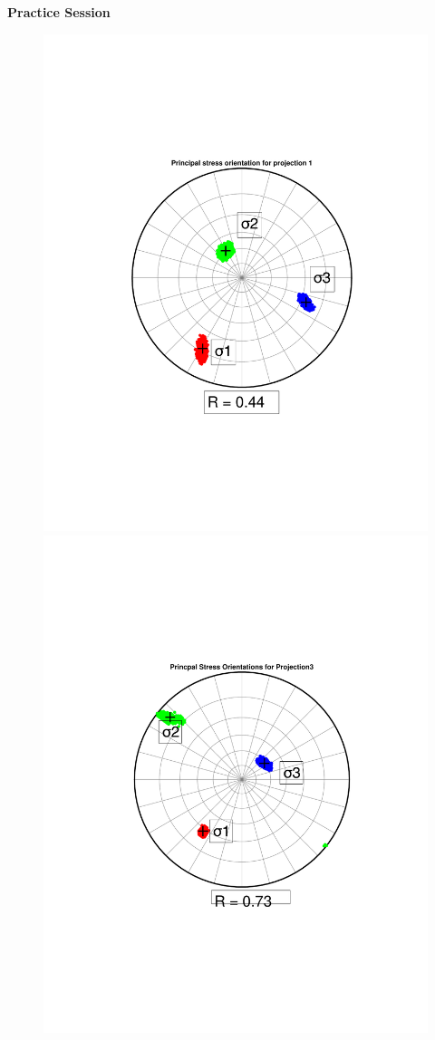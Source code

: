 \documentclass[11pt]{beamer}
\begin{document}
\begin{frame}{\textbf{Practice Session}}
    \begin{figure}
        \includegraphics[width=0.5\linewidth]{images/proj2.pdf}
        \includegraphics[width=0.5\linewidth]{images/proj3.pdf}
    \end{figure}
\end{frame}
\end{document}
